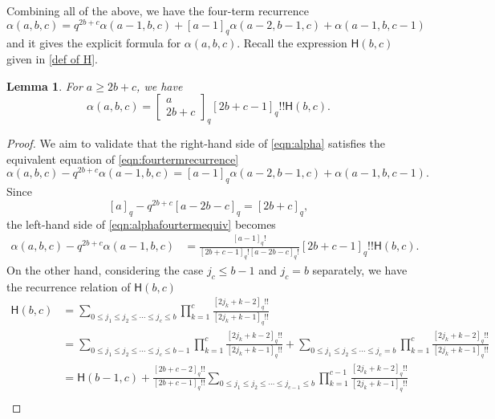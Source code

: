 \documentclass{amsart}
\newcommand{\qbinom}[2]{{\begin{bmatrix}#1\\#2\end{bmatrix}}_q}
\theoremstyle{plain}
\newtheorem{lem}[thm]{Lemma}
\theoremstyle{remark}
\numberwithin{equation}{section}
\begin{document}
Combining all of the above, we have the four-term recurrence
\begin{equation}\label{eqn:fourtermrecurrence}
    \alpha(a,b,c)=q^{2b+c}\alpha(a-1,b,c)+[a-1]_{q}\alpha(a-2,b-1,c)+\alpha(a-1,b,c-1)
\end{equation}
and it gives the explicit formula for $\alpha(a,b,c)$. Recall the expression $\mathsf{H}(b,c)$ given in \eqref{def of H}.
\begin{lem}\label{lem:alpha(a,b,c)}
    For $a\geq 2b+c$, we have
    \begin{equation}\label{eqn:alpha}
        \alpha(a,b,c)
        =\qbinom{a}{2b+c}[2b+c-1]_{q}!!\mathsf{H}(b,c).
    \end{equation}
\end{lem}
\begin{proof}
    We aim to validate that the right-hand side of \eqref{eqn:alpha} satisfies the equivalent equation of \eqref{eqn:fourtermrecurrence}
    \begin{equation}\label{eqn:alphafourtermequiv}
        \alpha(a,b,c)-q^{2b+c}\alpha(a-1,b,c)=[a-1]_{q}\alpha(a-2,b-1,c)+\alpha(a-1,b,c-1).
    \end{equation}
    Since $$[a]_{q}-q^{2b+c}[a-2b-c]_{q}=[2b+c]_{q},$$ the left-hand side of \eqref{eqn:alphafourtermequiv} becomes
    \begin{align*}
        \alpha(a,b,c)-q^{2b+c}\alpha(a-1,b,c)
        &=\frac{[a-1]_{q}!}{[2b+c-1]_{q}![a-2b-c]_{q}!}[2b+c-1]_{q}!!\mathsf{H}(b,c).
    \end{align*} 
    On the other hand, considering the case $j_{c}\leq b-1$ and $j_{c}=b$ separately, we have the recurrence relation of $\mathsf{H}(b,c)$
    \begin{align*}
        \mathsf{H}(b,c)
        &=\sum_{0\leq j_{1}\leq j_{2}\leq\cdots\leq j_{c}\leq b}\prod_{k=1}^{c}\frac{[2j_{k}+k-2]_{q}!!}{[2j_{k}+k-1]_{q}!!}\\
        &=\sum_{0\leq j_{1}\leq j_{2}\leq\cdots\leq j_{c}\leq b-1}\prod_{k=1}^{c}\frac{[2j_{k}+k-2]_{q}!!}{[2j_{k}+k-1]_{q}!!}
        +\sum_{0\leq j_{1}\leq j_{2}\leq\cdots\leq j_{c}= b}\prod_{k=1}^{c}\frac{[2j_{k}+k-2]_{q}!!}{[2j_{k}+k-1]_{q}!!}\\
        &=\mathsf{H}(b-1,c)+\frac{[2b+c-2]_{q}!!}{[2b+c-1]_{q}!!}\sum_{0\leq j_{1}\leq j_{2}\leq\cdots\leq j_{c-1}\leq b}\prod_{k=1}^{c-1}\frac{[2j_{k}+k-2]_{q}!!}{[2j_{k}+k-1]_{q}!!}\\

\end{align*}
\end{proof}
\end{document}
